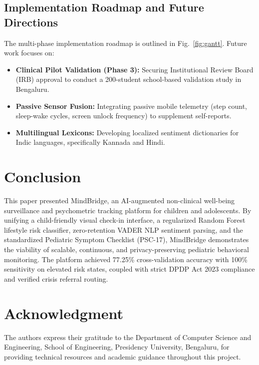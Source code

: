 \documentclass[conference]{IEEEtran}
\begin{document}
\subsection{Implementation Roadmap and Future Directions}
The multi-phase implementation roadmap is outlined in Fig.~\ref{fig:gantt}. Future work focuses on:
\begin{itemize}
    \item \textbf{Clinical Pilot Validation (Phase 3):} Securing Institutional Review Board (IRB) approval to conduct a 200-student school-based validation study in Bengaluru.
    \item \textbf{Passive Sensor Fusion:} Integrating passive mobile telemetry (step count, sleep-wake cycles, screen unlock frequency) to supplement self-reports.
    \item \textbf{Multilingual Lexicons:} Developing localized sentiment dictionaries for Indic languages, specifically Kannada and Hindi.
\end{itemize}

\section{Conclusion}
\label{sec:conclusion}
This paper presented MindBridge, an AI-augmented non-clinical well-being surveillance and psychometric tracking platform for children and adolescents. By unifying a child-friendly visual check-in interface, a regularized Random Forest lifestyle risk classifier, zero-retention VADER NLP sentiment parsing, and the standardized Pediatric Symptom Checklist (PSC-17), MindBridge demonstrates the viability of scalable, continuous, and privacy-preserving pediatric behavioral monitoring. The platform achieved 77.25\% cross-validation accuracy with 100\% sensitivity on elevated risk states, coupled with strict DPDP Act 2023 compliance and verified crisis referral routing.

\section*{Acknowledgment}
The authors express their gratitude to the Department of Computer Science and Engineering, School of Engineering, Presidency University, Bengaluru, for providing technical resources and academic guidance throughout this project.

\balance


\end{document}
